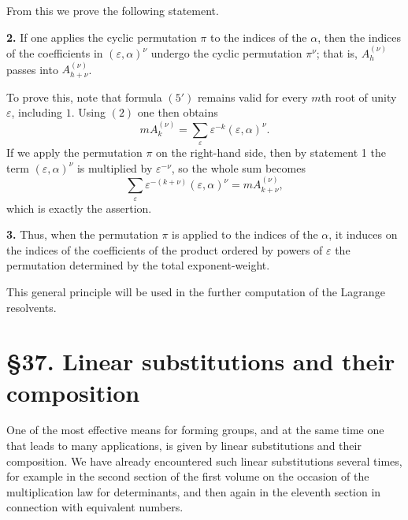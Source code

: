 \documentclass[11pt]{article}
\begin{document}
From this we prove the following statement.

\medskip
\noindent\textbf{2.}
If one applies the cyclic permutation $\pi$ to the indices of the $\alpha$, then the indices of the coefficients in $(\varepsilon,\alpha)^\nu$ undergo the cyclic permutation $\pi^\nu$; that is, $A^{(\nu)}_h$ passes into $A^{(\nu)}_{h+\nu}$.

\medskip
To prove this, note that formula \((5')\) remains valid for every $m$th root of unity $\varepsilon$, including $1$. Using \((2)\) one then obtains
\[
mA^{(\nu)}_k=\sum_{\varepsilon}\varepsilon^{-k}(\varepsilon,\alpha)^\nu.
\tag{6}
\]
If we apply the permutation $\pi$ on the right-hand side, then by statement 1 the term $(\varepsilon,\alpha)^\nu$ is multiplied by $\varepsilon^{-\nu}$, so the whole sum becomes
\[
\sum_{\varepsilon}\varepsilon^{-(k+\nu)}(\varepsilon,\alpha)^\nu
=
mA^{(\nu)}_{k+\nu},
\]
which is exactly the assertion.

\medskip
\noindent\textbf{3.}
Thus, when the permutation $\pi$ is applied to the indices of the $\alpha$, it induces on the indices of the coefficients of the product ordered by powers of $\varepsilon$ the permutation determined by the total exponent-weight.

\medskip
This general principle will be used in the further computation of the Lagrange resolvents.

\medskip

\clearpage

\section*{\S 37. Linear substitutions and their composition}

One of the most effective means for forming groups, and at the same time one that leads to many applications, is given by linear substitutions and their composition. We have already encountered such linear substitutions several times, for example in the second section of the first volume on the occasion of the multiplication law for determinants, and then again in the eleventh section in connection with equivalent numbers.
\end{document}
